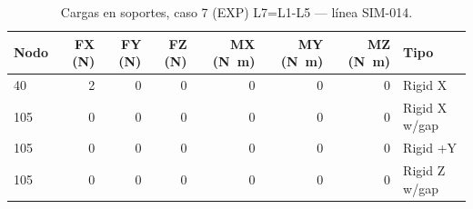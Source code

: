\begin{table}[htbp]
  \centering
  \footnotesize
  \caption{Cargas en soportes, caso 7 (EXP) L7=L1-L5 — línea SIM-014.}
  \label{tab:restricciones-exp}
  \begin{tabular}{lrrrrrrl}
    \toprule
    Nodo & FX (\si{N}) & FY (\si{N}) & FZ (\si{N}) & MX (\si{N.m}) & MY (\si{N.m}) & MZ (\si{N.m}) & Tipo \\
    \midrule
    40 & \num{2} & \num{0} & \num{0} & \num{0} & \num{0} & \num{0} & Rigid X \\
    105 & \num{0} & \num{0} & \num{0} & \num{0} & \num{0} & \num{0} & Rigid X w/gap \\
    105 & \num{0} & \num{0} & \num{0} & \num{0} & \num{0} & \num{0} & Rigid +Y \\
    105 & \num{0} & \num{0} & \num{0} & \num{0} & \num{0} & \num{0} & Rigid Z w/gap \\
    \bottomrule
  \end{tabular}
\end{table}
